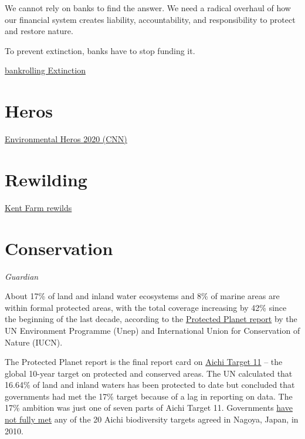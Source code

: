 \documentclass[
]{book}
\begin{document}
We cannot rely on banks to find the answer. We need
a radical overhaul of how our financial system creates
liability, accountability, and responsibility to protect
and restore nature.

To prevent extinction, banks have to stop
funding it.

\href{https://portfolio.earth/campaigns/bankrolling-extinction/}{bankrolling Extinction}

\hypertarget{heros}{%
\section{Heros}\label{heros}}

\href{https://edition.cnn.com/2020/12/31/world/new-years-resolution-2021-heal-nature-c2e-spc-intl/index.html}{Environmental Heros 2020 (CNN)}

\hypertarget{rewilding}{%
\section{Rewilding}\label{rewilding}}

\href{https://edition.cnn.com/2020/10/01/world/knepp-farm-rewilding-scn-cte-spc/index.html}{Kent Farm rewilds}

\hypertarget{conservation}{%
\section{Conservation}\label{conservation}}

\emph{Guardian}

About 17\% of land and inland water ecosystems and 8\% of marine areas are within formal protected areas, with the total coverage increasing by 42\% since the beginning of the last decade, according to the \href{https://livereport.protectedplanet.net/}{Protected Planet report} by the UN Environment Programme (Unep) and International Union for Conservation of Nature (IUCN).

The Protected Planet report is the final report card on \href{http://url3193.iucn-crm.org/ls/click}{Aichi Target 11} -- the global 10-year target on protected and conserved areas. The UN calculated that 16.64\% of land and inland waters has been protected to date but concluded that governments had met the 17\% target because of a lag in reporting on data. The 17\% ambition was just one of seven parts of Aichi Target 11. Governments \href{https://www.theguardian.com/environment/2020/sep/15/every-global-target-to-stem-destruction-of-nature-by-2020-missed-un-report-aoe}{have not fully met} any of the 20 Aichi biodiversity targets agreed in Nagoya, Japan, in 2010.
\end{document}
